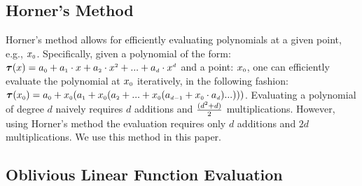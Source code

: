 

\vspace{-3.5mm}

\subsection{Horner's Method}
\vspace{-1mm}

Horner's method \cite{DBLP:journals/ibmrd/Dorn62} allows for efficiently evaluating polynomials at a given point, e.g., $x_{\scriptscriptstyle 0}$. Specifically, given a polynomial of the form: $\bm\tau(x)= a_{\scriptscriptstyle 0}+a_{\scriptscriptstyle 1}\cdot x+a_{\scriptscriptstyle 2}\cdot x^{\scriptscriptstyle 2}+...+a_{\scriptscriptstyle d}\cdot x^{\scriptscriptstyle d}$ and a point: $x_{\scriptscriptstyle 0}$, one can efficiently evaluate the polynomial at $x_{\scriptscriptstyle 0}$ iteratively, in the following fashion: $\bm\tau(x_{\scriptscriptstyle 0})=a_{\scriptscriptstyle 0}+x_{\scriptscriptstyle 0}(a_{\scriptscriptstyle 1} + x_{\scriptscriptstyle 0}(a_{\scriptscriptstyle 2}+...+x_{\scriptscriptstyle 0}(a_{\scriptscriptstyle d-1}+x_{\scriptscriptstyle 0}\cdot a_{\scriptscriptstyle d})...)))$. Evaluating  a polynomial of degree $d$ naively requires  $d$ additions and $\frac{(d^{\scriptscriptstyle 2}+d)}{2}$ multiplications. However, using Horner's method the evaluation requires only $d$ additions and $2d$ multiplications. We use this method in this paper. 

\vspace{-3.4mm}

\subsection{Oblivious Linear Function Evaluation}\label{sec::OLE-plus}
\vspace{-1mm}

